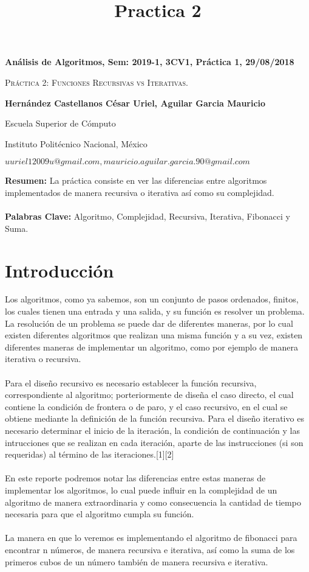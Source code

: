 \documentclass[12pt,twoside]{article}
\title{Practica 2}
\date{}
\begin{document}
\centerline{\bf An\'alisis de Algoritmos, Sem: 2019-1, 3CV1, Pr\'actica 1, 29/08/2018}
\centerline{}
\centerline{}
\begin{center}
\Large{\textsc{Pr\'actica 2:  Funciones Recursivas vs Iterativas.}}
\end{center}
\centerline{}
\centerline{\bf {Hern\'andez Castellanos C\'esar Uriel, Aguilar Garcia Mauricio}}
\centerline{}
\centerline{Escuela Superior de C\'omputo}
\centerline{Instituto Polit\'ecnico Nacional, M\'exico}
\centerline{$uuriel12009u@gmail.com, mauricio.aguilar.garcia.90@gmail.com$}
\newtheorem{Theorem}{\quad Theorem}[section]
\newtheorem{Definition}[Theorem]{\quad Definition}
\newtheorem{Corollary}[Theorem]{\quad Corollary}
\newtheorem{Lemma}[Theorem]{\quad Lemma}
\newtheorem{Example}[Theorem]{\quad Example}
\bigskip
\textbf{Resumen:} La práctica consiste en ver las diferencias entre algoritmos implementados
de manera recursiva o iterativa así como su complejidad.
\\\\
{\bf Palabras Clave:} Algoritmo, Complejidad, Recursiva, Iterativa, Fibonacci y Suma.
\section{Introducción}
Los algoritmos, como ya sabemos, son un conjunto de pasos ordenados, finitos,
los cuales tienen una entrada y una salida, y su función es resolver un
problema. La resolución de un problema se puede dar de diferentes maneras,
por lo cual existen diferentes algoritmos que realizan una misma función y a su
vez, existen diferentes maneras de implementar un algoritmo, como por ejemplo
de manera iterativa o recursiva.\\
\\Para el diseño recursivo es necesario establecer la función recursiva, correspondiente
al algoritmo; porteriormente de diseña el caso directo, el cual contiene
la condición de frontera o de paro, y el caso recursivo, en el cual se obtiene
mediante la definición de la función recursiva. Para el diseño iterativo es necesario
determinar el inicio de la iteración, la condición de continuación y las
intrucciones que se realizan en cada iteración, aparte de las instrucciones (si son
requeridas) al término de las iteraciones.[1][2]\\
\\En este reporte podremos notar las diferencias entre estas maneras de implementar
los algoritmos, lo cual puede influir en la complejidad de un algoritmo
de manera extraordinaria y como consecuencia la cantidad de tiempo necesaria
para que el algoritmo cumpla su función.\\
\\La manera en que lo veremos es implementando el algoritmo de fibonacci
para encontrar n números, de manera recursiva e iterativa, así como la suma de
los primeros cubos de un número también de manera recursiva e iterativa.\\\\
\vspace{50 mm}
\end{document}
